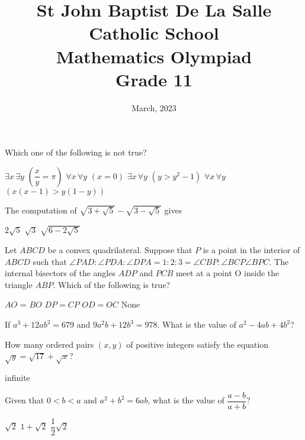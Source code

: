 \documentclass[12pt,addpoints]{exam}
\date{March, 2023}
\begin{document}
	\title{St John Baptist De La Salle Catholic School\\
		\large Mathematics Olympiad\\
		Grade 11}
	\maketitle
	\begin{questions}
		\question Which one of the following is not true?
		\begin{choices}
			\choice $\exists x\, \exists y $ $(\dfrac{x}{y}=\pi)$
			\choice $\forall x\, \forall y $ $(x=0)$
			\choice $\exists x\, \forall y $ $(y>y^2-1)$
			\choice $\forall x\, \forall y $ $(x(x-1)>y(1-y))$
		\end{choices}
		\question The computation of $\sqrt{3+\sqrt{5}}-\sqrt{3-\sqrt{5}}$ gives \\ \begin{oneparchoices}
			\choice $2\sqrt{5}$
			\choice $\sqrt{3}$
			\choice $\sqrt{6-2\sqrt{5}}$
		\end{oneparchoices}
		\question Let $ABCD$ be a convex quadrilateral. Suppose that $P$ is a point in the interior of $ABCD$ such that $\angle PAD:\angle PDA:\angle DPA=1:2:3=\angle CBP:\angle BCP\angle BPC$. The internal bisectors of the angles $ADP$ and $PCB$ meet at a point O inside the triangle $ABP$. Which of the following is true? \\ \begin{oneparchoices}
			\choice $AO$ = $BO$
			\choice $DP = CP $
			\choice $OD = OC $
			\choice None
		\end{oneparchoices}
		\question If $a^3+12ab^2=679$ and $9a^2b+12b^3=978$. What is the value of $a^2-4ab+4b^2$? \\ \begin{oneparchoices}
			\choice 1
			\choice 9
			\choice 25
			\choice 49
		\end{oneparchoices}
		\question How many ordered pairs $(x,y)$ of positive integers satisfy the equation $\sqrt{y}=\sqrt{17}+\sqrt{x}$? \\ \begin{oneparchoices}
			\choice 0
			\choice 1
			\choice 2
			\choice infinite
		\end{oneparchoices}
		\question Given that $0<b<a$ and $a^2+b^2=6ab$, what is the value of $\dfrac{a-b}{a+b}$? \\ \begin{oneparchoices}
			\choice $\sqrt{2}$
			\choice $1+\sqrt{2}$
			\choice $\dfrac{1}{2}\sqrt{2}$

\end{oneparchoices}
\end{questions}
\end{document}
